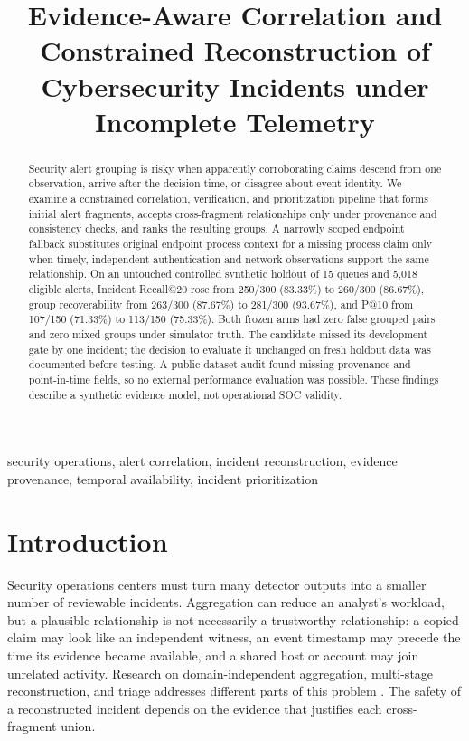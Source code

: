 \title{Evidence-Aware Correlation and Constrained Reconstruction of Cybersecurity Incidents under Incomplete Telemetry}
\author{
}
\maketitle
\begin{abstract}
Security alert grouping is risky when apparently corroborating claims descend from one observation, arrive after the decision time, or disagree about event identity. We examine a constrained correlation, verification, and prioritization pipeline that forms initial alert fragments, accepts cross-fragment relationships only under provenance and consistency checks, and ranks the resulting groups. A narrowly scoped endpoint fallback substitutes original endpoint process context for a missing process claim only when timely, independent authentication and network observations support the same relationship. On an untouched controlled synthetic holdout of 15 queues and 5,018 eligible alerts, Incident Recall@20 rose from 250/300 (83.33\%) to 260/300 (86.67\%), group recoverability from 263/300 (87.67\%) to 281/300 (93.67\%), and P@10 from 107/150 (71.33\%) to 113/150 (75.33\%). Both frozen arms had zero false grouped pairs and zero mixed groups under simulator truth. The candidate missed its development gate by one incident; the decision to evaluate it unchanged on fresh holdout data was documented before testing. A public dataset audit found missing provenance and point-in-time fields, so no external performance evaluation was possible. These findings describe a synthetic evidence model, not operational SOC validity.
\end{abstract}
\begin{IEEEkeywords}
security operations, alert correlation, incident reconstruction, evidence provenance, temporal availability, incident prioritization
\end{IEEEkeywords}

\section{Introduction}
Security operations centers must turn many detector outputs into a smaller number of reviewable incidents. Aggregation can reduce an analyst's workload, but a plausible relationship is not necessarily a trustworthy relationship: a copied claim may look like an independent witness, an event timestamp may precede the time its evidence became available, and a shared host or account may join unrelated activity. Research on domain-independent aggregation, multi-stage reconstruction, and triage addresses different parts of this problem \cite{landauer2022,wang2024,grain2025,sadlek2025}. The safety of a reconstructed incident depends on the evidence that justifies each cross-fragment union.

